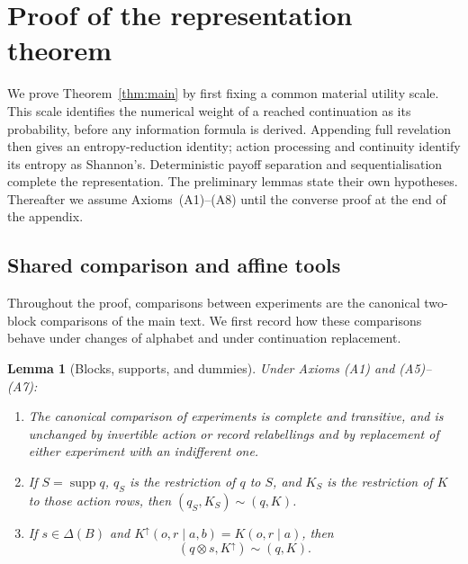 \documentclass[11pt,a4paper]{article}
\newtheorem{lemma}[theorem]{Lemma}
\theoremstyle{definition}
\newcommand{\D}{\Delta}
\newcommand{\supp}{\operatorname{supp}}
\newcommand{\1}{\mathbf 1}
\begin{document}
\section{Proof of the representation theorem}
\label{app:main-proof}

We prove Theorem~\ref{thm:main} by first fixing a common material utility
scale.  This scale identifies the numerical weight of a reached continuation
as its probability, before any information formula is derived.  Appending
full revelation then gives an entropy-reduction identity; action processing
and continuity identify its entropy as Shannon's.  Deterministic payoff
separation and sequentialisation complete the representation.
The preliminary lemmas state their own hypotheses.  Thereafter we assume
Axioms~\textup{(A1)--(A8)} until the converse proof at the end of the appendix.

\subsection{Shared comparison and affine tools}

Throughout the proof, comparisons between experiments are the canonical
two-block comparisons of the main text.  We first record how these comparisons
behave under changes of alphabet and under continuation replacement.

\begin{lemma}[Blocks, supports, and dummies]\label{lf:lem:bookkeeping}
Under Axioms \textup{(A1)} and \textup{(A5)--(A7)}:
\begin{enumerate}[label=\textup{(\alph*)},leftmargin=*]
\item The canonical comparison of experiments is complete and transitive,
and is unchanged by invertible action or record relabellings and by
replacement of either experiment with an indifferent one.
\item If $S=\supp q$, $q_S$ is the restriction of $q$ to $S$, and $K_S$
is the restriction of $K$ to those action rows, then
$(q_S,K_S)\sim(q,K)$.
\item If $s\in\D(B)$ and
$K^\uparrow(o,r\mid a,b)=K(o,r\mid a)$, then
\begin{equation}
(q\otimes s,K^\uparrow)\sim(q,K).
\label{lf:eq:dummy-ordinal}
\end{equation}
\end{enumerate}
\end{lemma}
\end{document}
